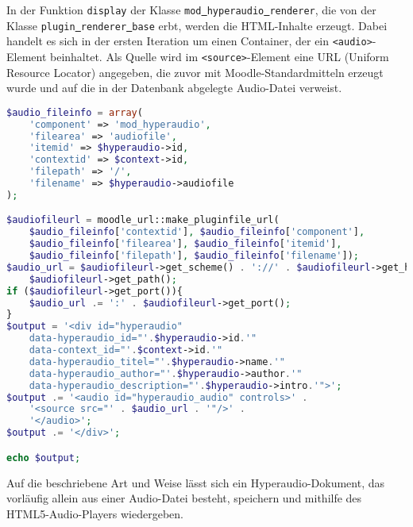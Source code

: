 In der Funktion \texttt{display} der Klasse \mbox{\texttt{mod\underline{{ }}hyperaudio\underline{{ }}renderer}}, die von der Klasse \mbox{\texttt{plugin\underline{{ }}renderer\underline{{ }}base}} erbt, werden die HTML-Inhalte erzeugt. Dabei handelt es sich in der ersten Iteration um einen Container, der ein \texttt{<audio>}-Element beinhaltet. Als Quelle wird im \texttt{<source>}-Element eine URL (Uniform Resource Locator) angegeben, die zuvor mit Moodle-Standardmitteln erzeugt wurde und auf die in der Datenbank abgelegte Audio-Datei verweist.

\begin{lstlisting}[language=php,
             linewidth=\textwidth,
             caption={Ausschnitt der \textbf{renderer.php} in der 1. Iteration},
             label={lst:it1:renderer}]
$audio_fileinfo = array(
    'component' => 'mod_hyperaudio',
    'filearea' => 'audiofile',
    'itemid' => $hyperaudio->id,
    'contextid' => $context->id,
    'filepath' => '/',
    'filename' => $hyperaudio->audiofile
);

$audiofileurl = moodle_url::make_pluginfile_url(
    $audio_fileinfo['contextid'], $audio_fileinfo['component'],
    $audio_fileinfo['filearea'], $audio_fileinfo['itemid'],
    $audio_fileinfo['filepath'], $audio_fileinfo['filename']);
$audio_url = $audiofileurl->get_scheme() . '://' . $audiofileurl->get_host() .
    $audiofileurl->get_path();
if ($audiofileurl->get_port()){
    $audio_url .= ':' . $audiofileurl->get_port();
}
$output = '<div id="hyperaudio" 
    data-hyperaudio_id="'.$hyperaudio->id.'"
    data-context_id="'.$context->id.'"
    data-hyperaudio_titel="'.$hyperaudio->name.'"
    data-hyperaudio_author="'.$hyperaudio->author.'"
    data-hyperaudio_description="'.$hyperaudio->intro.'">';
$output .= '<audio id="hyperaudio_audio" controls>' .
    '<source src="' . $audio_url . '"/>' .
    '</audio>';
$output .= '</div>';

echo $output;
\end{lstlisting}

Auf die beschriebene Art und Weise lässt sich ein Hyperaudio-Dokument, das vorläufig allein aus einer Audio-Datei besteht, speichern und mithilfe des HTML5-Audio-Players wiedergeben.


